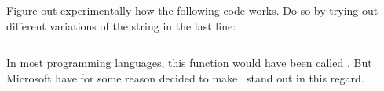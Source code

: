Figure out experimentally how the following code works. Do so by trying out different variations of the string in the last line:


\inputminted{csharp}{\context/question/Formatting.cs}

In most programming languages, this function would have been called . But Microsoft have for some reason decided to make \csharp\ stand out in this regard.
